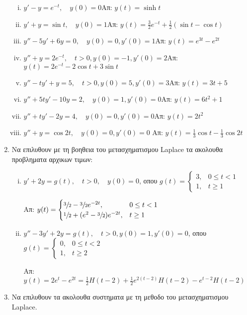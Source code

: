 \begin{enumerate}
\begin{enumerate}[i)]
\item $y'-y=e^{-t},\quad y(0)=0$\hfill Απ: $y(t)=\sinh t$
\item $y'+y=\sin t,\quad y(0)=1$\hfill Απ: $y(t)=\frac{3}{2}e^{-t}+\frac{1}{2}(\sin t-\cos t)$
\item $y''-5y'+6y=0,\quad y(0)=0, y'(0)=1$\hfill Απ: $y(t)=e^{3t}-e^{2t}$
\item $y''+y=2e^{-t},\quad t>0, y(0)=-1, y'(0)=2$\hfill Απ: $y(t)=2e^{-t}-2\cos t+3\sin t$
\item $y''-ty'+y=5, \quad t>0, y(0)=5, y'(0)=3$\hfill Απ: $y(t)=3t+5$
\item $y'' +5ty'-10y=2, \quad y(0)=1, y'(0)=0$\hfill Απ: $y(t)=6t^2+1$
\item $y'' +ty'-2y=4, \quad y(0)=0, y'(0)=0$\hfill Απ: $y(t)=2t^2$
\item $y''+y =\cos 2t, \quad y(0)=0, y'(0)=0$ \hfill Απ: $y(t)=\frac{1}{3}\cos t-\frac{1}{3}\cos 2t$
\end{enumerate}

\item Να επιλυθουν με τη βοηθεια του μετασχηματισμου Laplace τα ακολουθα προβληματα αρχικων τιμων:

\begin{enumerate}[i)]
\item $y'+2y=g(t),\quad t>0,\quad y(0)=0$, οπου $g(t)=\begin{cases}3, & 0\leq t<1 \\ 1, & t\geq 1\end{cases}$

\hfill Απ: $y(t)=\begin{cases} \sfrac{3}{2}-\sfrac{3}{2}e^{-2t},& 0\leq t<1 \\ \sfrac{1}{2}+(e^2-\sfrac{3}{2})e^{-2t}, & t\geq 1\end{cases}$

\item $y''-3y'+2y=g(t),\quad t>0, y(0)=1, y'(0)=0$, οπου $g(t)=\begin{cases} 0, & 0\leq t<2 \\ 1, & t\geq 2\end{cases}$

\hfill Απ: $y(t)=2e^t-e^{2t}=\frac{1}{2}H(t-2)+\frac{1}{2}e^{2(t-2)}H(t-2)-e^{t-2}H(t-2)$
\end{enumerate}






\item Να επιλυθουν τα ακολουθα συστηματα με τη μεθοδο του μετασχηματισμου Laplace.


\end{enumerate}
